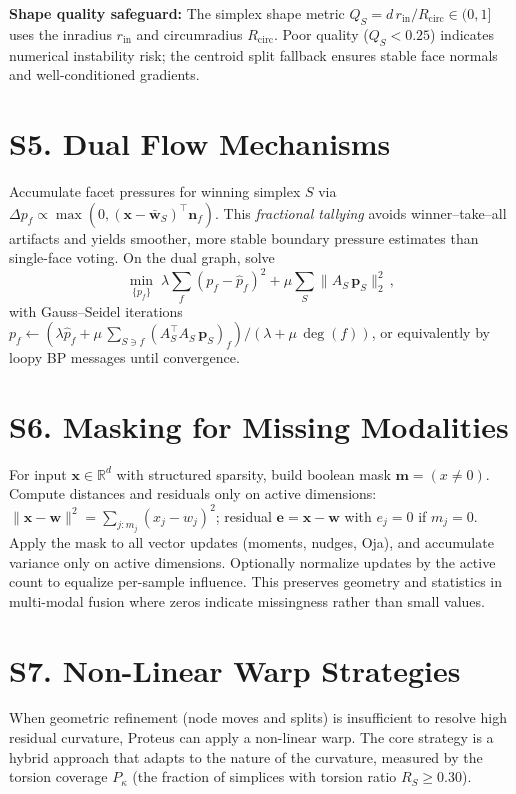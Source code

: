 \documentclass[11pt]{article}
\begin{document}
\textbf{Shape quality safeguard:} The simplex shape metric $Q_S = d\,r_{\mathrm{in}}/R_{\mathrm{circ}} \in (0,1]$ uses the inradius $r_{\mathrm{in}}$ and circumradius $R_{\mathrm{circ}}$. Poor quality ($Q_S < 0.25$) indicates numerical instability risk; the centroid split fallback ensures stable face normals and well-conditioned gradients.

\section*{S5. Dual Flow Mechanisms}
Accumulate facet pressures for winning simplex $S$ via $\Delta p_f \propto \max(0,(\mathbf x{-}\bar{\mathbf w}_S)^{\top}\mathbf n_f)$. This \emph{fractional tallying} avoids winner–take–all artifacts and yields smoother, more stable boundary pressure estimates than single-face voting. On the dual graph, solve
\[\min_{\{p_f\}}\; \lambda\sum_f (p_f{-}\hat p_f)^2 + \mu\sum_S \lVert A_S\,\mathbf p_S\rVert_2^2\,,\]
with Gauss--Seidel iterations $p_f\leftarrow (\lambda\hat p_f + \mu\,\sum_{S\ni f}(A_S^{\top}A_S\,\mathbf p_S)_f)/(\lambda + \mu\,\deg(f))$, or equivalently by loopy BP messages until convergence.

\section*{S6. Masking for Missing Modalities}
For input $\mathbf x\in\mathbb R^d$ with structured sparsity, build boolean mask $\mathbf m=(x\neq 0)$. Compute distances and residuals only on active dimensions: $\lVert \mathbf x{-}\mathbf w\rVert^2=\sum_{j:m_j} (x_j{-}w_j)^2$; residual $\mathbf e=\mathbf x{-}\mathbf w$ with $e_j{=}0$ if $m_j{=}0$. Apply the mask to all vector updates (moments, nudges, Oja), and accumulate variance only on active dimensions. Optionally normalize updates by the active count to equalize per-sample influence. This preserves geometry and statistics in multi-modal fusion where zeros indicate missingness rather than small values.

\section*{S7. Non-Linear Warp Strategies}
When geometric refinement (node moves and splits) is insufficient to resolve high residual curvature, Proteus can apply a non-linear warp. The core strategy is a hybrid approach that adapts to the nature of the curvature, measured by the torsion coverage $P_\kappa$ (the fraction of simplices with torsion ratio $R_S \ge 0.30$).
\end{document}
